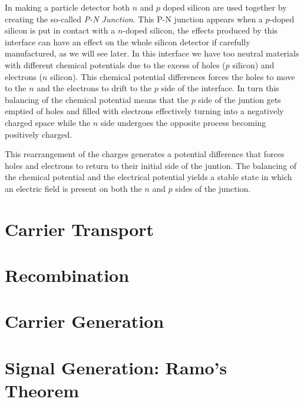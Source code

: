 In making a particle detector both $n$ and $p$ doped silicon are used together by creating the so-called \textit{P-N Junction}. This P-N junction appears when a $p$-doped silicon is put in contact with a $n$-doped silicon, the effects produced by this interface can have an effect on the whole silicon detector if carefully manufactured, as we will see later. In this interface we have too neutral materials with different chemical potentials due to the excess of holes ($p$ silicon) and electrons ($n$ silicon). This chemical potential differences forces the holes to move to the $n$ and the electrons to drift to the $p$ side of the interface. In turn this balancing of the chemical potential means that the $p$ side of the juntion gets emptied of holes and filled with electrons effectively turning into a negatively charged space while the $n$ side undergoes the opposite process becoming positively charged.

This rearrangement of the charges generates a potential difference that forces holes and electrons to return to their initial side of the juntion. The balancing of the chemical potential and the electrical potential yields a stable state in which an electric field is present on both the $n$ and $p$ sides of the junction.  


\section{Carrier Transport}


\section{Recombination} 

\section{Carrier Generation}

\section{Signal Generation: Ramo's Theorem} %


